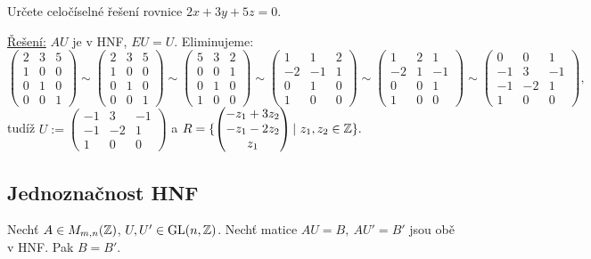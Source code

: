 \begin{example}
Určete celočíselné řešení rovnice $2x+3y+5z=0$.

\underline{Řešení:}
$AU$ je v HNF, $EU=U$. Eliminujeme:
$$\begin{pmatrix}
2 & 3 & 5\\
\hline 
1 & 0 & 0\\
0 & 1 & 0\\
0 & 0 & 1
\end{pmatrix}\sim
\begin{pmatrix}
2 & 3 & 5\\
\hline
1 & 0 & 0\\
0 & 1 & 0\\
0 & 0 & 1
\end{pmatrix}\sim
\begin{pmatrix}
5 & 3 & 2\\
\hline
0 & 0 & 1\\
0 & 1 & 0\\
1 & 0 & 0
\end{pmatrix}\sim
\begin{pmatrix}
1 & 1 & 2\\
\hline
-2 & -1 & 1\\
0 & 1 & 0\\
1 & 0 & 0
\end{pmatrix}\sim
\begin{pmatrix}
1 & 2 & 1\\
\hline
-2 & 1 & -1\\
0 & 0 & 1\\
1 & 0 & 0
\end{pmatrix}\sim
\begin{pmatrix}
0 & 0 & 1\\
\hline
-1 & 3 & -1\\
-1 & -2 & 1\\
1 & 0 & 0
\end{pmatrix},
$$ tudíž
$U := 
\begin{pmatrix}
-1 & 3 & -1\\
-1 & -2 & 1\\
1 & 0 & 0
\end{pmatrix}
$
a 
$
R = \{
\begin{pmatrix}
-z_1+3z_2\\
-z_1-2z_2\\
z_1
\end{pmatrix} | \ z_1, z_2 \in \operatorname{\mathbb{Z}}\}.
$
\end{example}

\subsection{Jednoznačnost HNF}
\begin{claim}
Nechť $A\in M_{m,n}(\operatorname{\mathbb{Z}})$, $U, U'\in\operatorname{GL}(n,\operatorname{\mathbb{Z}})$. Nechť matice $AU=B, \ AU'=B'$ jsou obě v HNF. Pak $B=B'$.
\end{claim}

